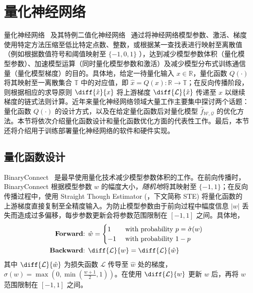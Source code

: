\documentclass[
  fontset = mac,
]{shtthesis}
\providecommand{\QuantNet}{\hat{f}_{\mathcal{W, Q}}}
\begin{document}
\section{量化神经网络}
量化神经网络~\citep{guo2018survey} 及其特例二值化神经网络~\citep{qin2020binary} 通过将神经网络模型参数、激活、梯度使用特定方法压缩至低比特定点数、整数，或根据某一查找表进行映射至离散值（例如根据数值符号和阈值映射至 $\{-1, 0, 1\}$ ），达到减少模型参数体积（量化模型参数）、加速模型运算（同时量化模型参数和激活）及减少模型分布式训练通信量（量化模型梯度）的目的。具体地，给定一待量化输入 $x\in \mathbb{R}$，量化函数 $Q(\cdot)$ 将其映射至一离散集合 $\mathbb{T}$ 中的对应值，即 $\hat{x} = Q(x): \mathbb{R} \to \mathbb{T}$；在反向传播阶段，则根据相应的求导原则 $\diff{\hat{x}}{x}$ 将上游梯度 $\diff{\mathcal{L}}{\hat{x}}$ 传递至 $x$ 以继续梯度的链式法则计算。近年来量化神经网络领域大量工作主要集中探讨两个话题：量化函数 $Q(\cdot)$ 的设计方式，以及在给定量化函数后对量化模型 $\QuantNet$ 的优化方法。本节将依次介绍量化函数设计和量化函数优化方面的代表性工作。最后，本节还将介绍用于训练部署量化神经网络的软件和硬件实现。
\subsection{量化函数设计}
BinaryConnect~\citep{courbariaux2015binaryconnect} 是最早使用量化技术减少模型参数体积的工作。在前向传播时，BinaryConnect 根据模型参数 $w$ 的幅度大小，\emph{随机地}将其映射至 $\{-1, 1\}$；在反向传播过程中，使用 Straight Though Estimator (\citet{bengio2013estimating}，下文简称 STE) 将量化函数的上游梯度直接复制至全精度输入。为防止模型参数由于前向过程中幅度信息 $|w|$ 丢失而造成过多偏移，每步参数更新会将参数范围限制在 $[-1, 1]$ 之间。具体地，
\begin{align}
  \text{\textbf{Forward}: } & \hat{w} = 
    \begin{cases}
      1 & \text{ with probability } p = \hat{\sigma}(w) \\
      -1 & \text{ with probability } 1 - p
    \end{cases} \\
  \text{\textbf{Backward}: } & \diff{\mathcal{L}}{w} = \diff{\mathcal{L}}{\hat{w}} \label{eq::background::ste}
\end{align}
其中 $\diff{\mathcal{L}}{\hat{w}}$ 为损失函数 $\mathcal{L}$ 传导至 $\hat{w}$ 处的梯度，$\hat{\sigma}(w) = \max(0, \min(\frac{w+1}{2}, 1))$。在使用 $\diff{\mathcal{L}}{w}$ 更新 $w$ 后，再将 $w$ 范围限制在 $[-1, 1]$ 之间。
\end{document}

